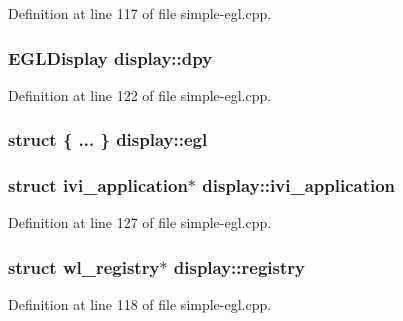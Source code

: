 Definition at line 117 of file simple-\/egl.\+cpp.

\subsubsection[{\texorpdfstring{dpy}{dpy}}]{\setlength{\rightskip}{0pt plus 5cm}E\+G\+L\+Display display\+::dpy}\hypertarget{structdisplay_a8a1cbda15a286e41e89a85f158ce9311}{}\label{structdisplay_a8a1cbda15a286e41e89a85f158ce9311}


Definition at line 122 of file simple-\/egl.\+cpp.

\subsubsection[{\texorpdfstring{egl}{egl}}]{\setlength{\rightskip}{0pt plus 5cm}struct \{ ... \}   display\+::egl}\hypertarget{structdisplay_a8b8bc104c19ff228d476a377e572d9c7}{}\label{structdisplay_a8b8bc104c19ff228d476a377e572d9c7}
\subsubsection[{\texorpdfstring{ivi\+\_\+application}{ivi_application}}]{\setlength{\rightskip}{0pt plus 5cm}struct ivi\+\_\+application$\ast$ display\+::ivi\+\_\+application}\hypertarget{structdisplay_a24c073faff3bb4799c2d46291f27ab89}{}\label{structdisplay_a24c073faff3bb4799c2d46291f27ab89}


Definition at line 127 of file simple-\/egl.\+cpp.

\subsubsection[{\texorpdfstring{registry}{registry}}]{\setlength{\rightskip}{0pt plus 5cm}struct wl\+\_\+registry$\ast$ display\+::registry}\hypertarget{structdisplay_a925781323f5c8eb84ef2225ed129de4b}{}\label{structdisplay_a925781323f5c8eb84ef2225ed129de4b}


Definition at line 118 of file simple-\/egl.\+cpp.

